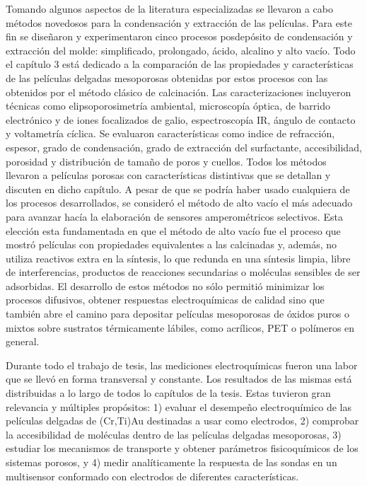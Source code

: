  Tomando algunos aspectos de la literatura especializadas se llevaron a cabo métodos novedosos para la condensación y extracción de las películas. Para este fin se diseñaron y experimentaron cinco procesos posdepósito de condensación y extracción del molde: simplificado, prolongado, ácido, alcalino y alto vacío. Todo el capítulo 3 está dedicado a la comparación de las propiedades y características de las películas delgadas mesoporosas obtenidas por estos procesos con las obtenidos por el método clásico de calcinación. Las caracterizaciones incluyeron técnicas como elipsoporosimetría ambiental, microscopía óptica, de barrido electrónico y de iones focalizados de galio, espectroscopía IR, ángulo de contacto y voltametría cíclica. Se evaluaron características como indice de refracción, espesor, grado de condensación, grado de extracción del surfactante, accesibilidad, porosidad y distribución de tamaño de poros y cuellos. Todos los métodos llevaron a películas porosas con características distintivas que se detallan y discuten en dicho capítulo. A pesar de que se podría haber usado cualquiera de los procesos desarrollados, se consideró el método de alto vacío el más adecuado para avanzar hacía la elaboración de sensores amperométricos selectivos. Esta elección esta fundamentada en que el método de alto vacío fue el proceso que mostró películas con propiedades equivalentes a las calcinadas y, además, no utiliza reactivos extra en la síntesis, lo que redunda en una síntesis limpia, libre de interferencias, productos de reacciones secundarias o moléculas sensibles de ser adsorbidas. El desarrollo de estos métodos no sólo permitió minimizar los procesos difusivos, obtener respuestas electroquímicas de calidad sino que también abre el camino para depositar películas mesoporosas de óxidos puros o mixtos sobre sustratos térmicamente lábiles, como acrílicos, PET o polímeros en general.

 Durante todo el trabajo de tesis, las mediciones electroquímicas fueron una labor que se llevó en forma transversal y constante. Los resultados de las mismas está distribuidas a lo largo de todos lo capítulos de la tesis. Estas tuvieron gran relevancia y múltiples propósitos: 1) evaluar el desempeño electroquímico de las películas delgadas de (Cr,Ti)\textbar Au destinadas a usar como electrodos, 2) comprobar la accesibilidad de moléculas dentro de las películas delgadas mesoporosas, 3) estudiar los mecanismos de transporte y obtener parámetros fisicoquímicos de los sistemas porosos, y 4) medir analíticamente la respuesta de las sondas en un multisensor conformado con electrodos de diferentes características.

